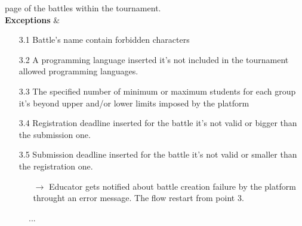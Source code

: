 \documentclass{article}
\begin{document}
{\begin{enumerate}
\begin{xltabular}{\textwidth}
                         page of the battles within the tournament.
                         \\
                        \hline
                        \textbf{Exceptions} &    \begin{itemize}
                                                    \item[3.1] Battle's name contain forbidden characters
                                                    \item[3.2] A programming language inserted it's not included in the tournament
                                                    allowed programming languages.
                                                    \item[3.3] The specified number of minimum or maximum students for each group
                                                    it's beyond upper and/or lower limits imposed by the platform
                                                    \item[3.4] Registration deadline inserted for the battle it's not valid or
                                                    bigger than the submission one.
                                                    \item[3.5] Submission deadline inserted for the battle it's not valid or 
                                                    smaller than the registration one.
                                                    \begin{itemize}
                                                        \item[$\rightarrow$] Educator gets notified about battle creation failure
                                                        by the platform throught an error message. The flow restart from point 3.
                                                    \end{itemize} 
                                                \end{itemize}
                    \end{xltabular}
                    
                    \begin{figure}[H]
                        \centering
                        \caption{...}
                        \label{fig:BattleCreationSeqDiagram}
                    \end{figure}
            \end{enumerate}
}
\end{document}
